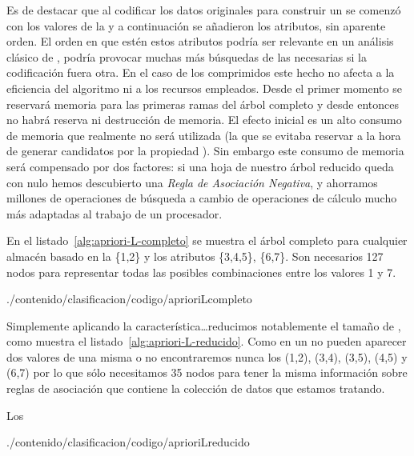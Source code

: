 Es de destacar que al codificar los datos originales para construir un \catalogo se comenzó con los valores de la \clase y a continuación se añadieron los atributos, sin aparente orden. El orden en que estén estos atributos podría ser relevante en un análisis clásico de \arm, podría provocar muchas más búsquedas de las necesarias si la codificación fuera otra. En el caso de los \catalogos comprimidos este hecho no afecta a la eficiencia del algoritmo ni a los recursos empleados. Desde el primer momento se reservará memoria para las primeras ramas del árbol \aprioriL completo y desde entonces no habrá reserva ni destrucción de memoria. El efecto inicial es un alto consumo de memoria que realmente no será utilizada (la que se evitaba reservar a la hora de generar candidatos por la propiedad \apriori). Sin embargo este consumo de memoria será compensado por dos factores: si una hoja de nuestro árbol \aprioriL reducido queda con \soporte nulo hemos descubierto una \emph{Regla de Asociación Negativa}, y ahorramos millones de operaciones de búsqueda a cambio de operaciones de cálculo mucho más adaptadas al trabajo de un procesador.








En el listado~\ref{alg:apriori-L-completo} se muestra el árbol \aprioriL completo para cualquier almacén \D basado en la \clase \{1,2\} y los atributos \{3,4,5\}, \{6,7\}. Son necesarios 127 nodos para representar todas las posibles combinaciones entre los valores 1 y 7.

\afterpage{\clearpage}

                 {./contenido/clasificacion/codigo/aprioriLcompleto}


Simplemente aplicando la característica\ldots reducimos notablemente el tamaño de \aprioriL, como muestra el listado~\ref{alg:apriori-L-reducido}. Como en un \registro no pueden aparecer dos valores de una misma \clase o \atributo no encontraremos nunca los \itemsets (1,2), (3,4), (3,5), (4,5) y (6,7) por lo que sólo necesitamos 35 nodos para tener la misma información sobre reglas de asociación que contiene la colección de datos que estamos tratando. 

Los

\afterpage{\clearpage}

                 {./contenido/clasificacion/codigo/aprioriLreducido}

